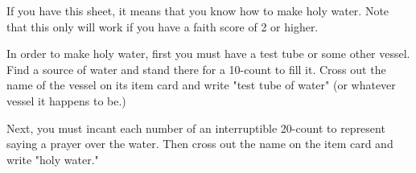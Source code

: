 \documentclass[green]{guildcamp4}
\begin{document}
\name{\gHoly{}}

If you have this sheet, it means that you know how to make holy water. Note that this only will work if you have a faith score of 2 or higher.

In order to make holy water, first you must have a test tube or some other vessel. Find a source of water and stand there for a 10-count to fill it. Cross out the name of the vessel on its item card and write "test tube of water" (or whatever vessel it happens to be.)

Next, you must incant each number of an interruptible 20-count to represent saying a prayer over the water. Then cross out the name on the item card and write "holy water."
\end{document}
